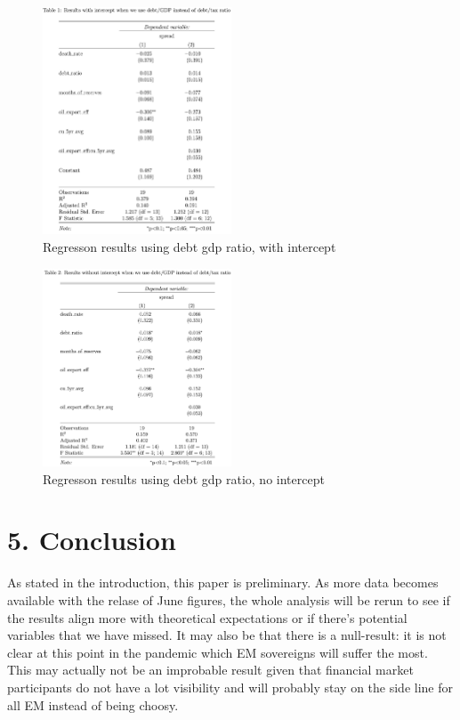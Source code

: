 \documentclass[11pt,]{article}
\begin{document}
\begin{figure}
\centering
\includegraphics[width=0.5\textwidth,height=\textheight]{reportfigures/AFTER_Regression_outputs_when_using_debt_gdp_ratio_intercept.png}
\caption{Regresson results using debt gdp ratio, with intercept}
\end{figure}

\begin{figure}
\centering
\includegraphics[width=0.5\textwidth,height=\textheight]{reportfigures/AFTER_Regression_outputs_when_using_debt_gdp_ratio_nointercept.png}
\caption{Regresson results using debt gdp ratio, no intercept}
\end{figure}

\hypertarget{conclusion}{%
\section{5. Conclusion}\label{conclusion}}

As stated in the introduction, this paper is preliminary. As more data
becomes available with the relase of June figures, the whole analysis
will be rerun to see if the results align more with theoretical
expectations or if there's potential variables that we have missed. It
may also be that there is a null-result: it is not clear at this point
in the pandemic which EM sovereigns will suffer the most. This may
actually not be an improbable result given that financial market
participants do not have a lot visibility and will probably stay on the
side line for all EM instead of being choosy.

\newpage
\singlespacing 

\end{document}
